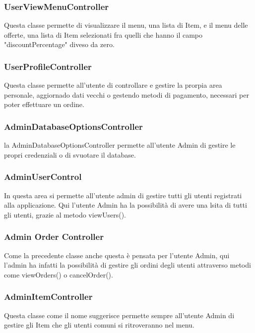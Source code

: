 \documentclass{article}
\begin{document}
\subsubsection{UserViewMenuController}
Questa classe permette di visualizzare il menu, una lista di Item, e il menu delle offerte, una lista di Item selezionati fra quelli che hanno il campo "discountPercentage" diveso da zero.

\subsubsection{UserProfileController}
Questa classe permette all'utente di controllare e gestire la prorpia area personale, aggiornado dati vecchi o gestendo metodi di pagamento, necessari per poter effettuare un ordine.

\subsubsection{AdminDatabaseOptionsController}
la AdminDatabaseOptionsController permette all'utente Admin di gestire le propri credenziali o di svuotare il database.

\subsubsection{AdminUserControl}
In questa area si permette all'utente admin di gestire tutti gli utenti registrati alla applicazione. Qui l'utente Admin ha la possibilità di avere una lsita di tutti gli utenti, grazie al metodo viewUsers().

\subsubsection{Admin Order Controller}
Come la precedente classe anche questa è pensata per l'utente Admin, qui l'admin ha infatti la possibilità di gestire gli ordini degli utenti attraverso metodi come viewOrders() o cancelOrder().

\subsubsection{AdminItemController}
Questa classe come il nome suggerisce permette sempre all'utente Admin di gestire gli Item che gli utenti comuni si ritroveranno nel menu.




\newpage


\end{document}
